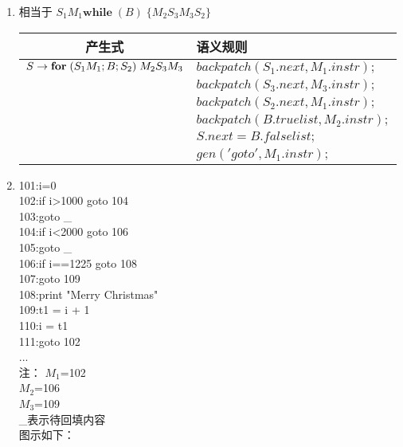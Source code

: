 \documentclass[a4paper, justified]{tufte-handout}
\begin{document}
\begin{solution}
  \begin{enumerate}[(1)]
    \item  相当于 $S_{1}M_{1}\textbf{while}\;(B)\; \{M_{2}S_{3}M_{3}S_{2}\}$
    \begin{table}[!htbp]
      \centering
      \begin{tabular}{|c|l|}
        \cline{1-2}
        产生式&语义规则\\    
        \hline
        $S \rightarrow \text{\bf for} \;(S_{1}M_{1}; B; S_{2})\; M_{2} S_{3}M_{3}$ 
        &  $backpatch(S_1.next,M_1.instr);$ \\ 
        &  $backpatch(S_3.next,M_3.instr);$ \\ 
        &  $backpatch(S_2.next,M_1.instr);$ \\ 
        &  $backpatch(B.truelist,M_2.instr);$ \\ 
        &  $S.next = B.falselist;$ \\ 
        &  $gen('goto',M_1.instr);$ \\ 
        
        \hline
      \end{tabular}
    \end{table}
\newpage
    \item  
        101:i=0\\
        102:if i>1000 goto 104\\
        103:goto \_\\
        104:if i<2000 goto 106\\
        105:goto \_\\
        106:if i==1225 goto 108\\
        107:goto 109\\
        108:print "Merry Christmas"\\
        109:t1 = i + 1\\
        110:i = t1\\
        111:goto 102\\
        ...\\
        注：
        $M_1$=102\\
        $M_2$=106\\
        $M_3$=109\\
        \_表示待回填内容\\
       图示如下：\\ 
  \end{enumerate}
\end{solution}




\end{document}
